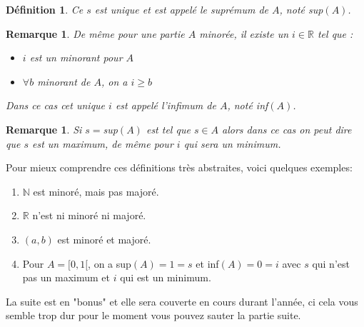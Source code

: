 \documentclass[a4paper, 12pt, french, twoside]{article}
\newtheorem{proposition}[theorem]{Proposition}
\newtheorem{defi}[theorem]{Définition}
\newtheorem{rem}[theorem]{Remarque}
\newcommand{\Nn}{{\mathbb{N}}}
\newcommand{\Rr}{{\mathbb{R}}}
\newcommand{\Qq}{{\mathbb{Q}}}
\begin{document}
\begin{defi}
    Ce $s$ est unique et est appelé le suprémum de $A$, noté sup$(A)$.  
\end{defi}
\begin{rem}
    De même pour une partie $A$ minorée, il existe un $i\in \Rr$ tel que :
    \begin{itemize}
    \item $i$ est un minorant pour $A$
    \item$\forall b$ minorant de $A$, on a $i\geq b$
\end{itemize}
    Dans ce cas cet unique $i$ est appelé l'infimum de $A$, noté inf$(A)$.
\end{rem}
\begin{rem}
    Si $s=$sup$(A)$ est tel que $s\in A$ alors dans ce cas on peut dire que $s$ est un maximum, de même pour $i$ qui sera un minimum.  
\end{rem}
Pour mieux comprendre ces définitions très abstraites, voici quelques exemples: 
\begin{enumerate}
\item $\Nn$ est minoré, mais pas majoré. 
\item $\Rr$ n'est ni minoré ni majoré. 
\item $(a,b)$ est minoré et majoré. 
    \item Pour $A=[0,1[$, on a sup$(A)=1=s$ et inf$(A)=0=i$ avec $s$ qui n'est pas un maximum et $i$ qui est un minimum. 
\end{enumerate}
La suite est en "bonus" et elle sera couverte en cours durant l'année, ci cela vous semble trop dur pour le moment vous pouvez sauter la partie suite.
    

\end{document}
